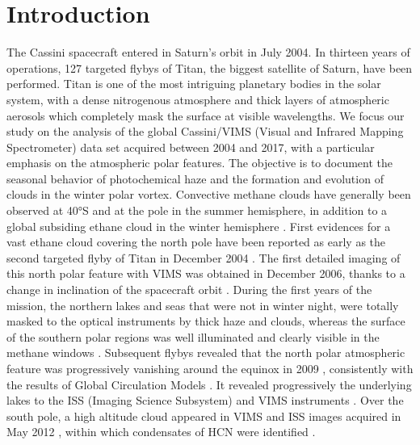 \documentclass[preprint,twocolumn,5p,authoryear,compress,colorlinks=true]{elsarticle}
\begin{document}
\section{Introduction}
The Cassini spacecraft entered in Saturn's orbit in July 2004. In thirteen years of operations, 127 targeted flybys of Titan, the biggest satellite of Saturn, have been performed. Titan is one of the most intriguing planetary bodies in the solar system, with a dense nitrogenous atmosphere and thick layers of atmospheric aerosols which completely mask the surface at visible wavelengths. We focus our study on the analysis of the global Cassini/VIMS (Visual and Infrared Mapping Spectrometer) data set acquired between 2004 and 2017, with a particular emphasis on the atmospheric polar features.
The objective is to document the seasonal behavior of photochemical haze and the formation and evolution of clouds in the winter polar vortex. Convective methane clouds have generally been observed at \ang{40}S and at the pole in the summer hemisphere, in addition to a global subsiding ethane cloud in the winter hemisphere \citep{Griffith2006,Hirtzig2006,Rannou2006,Rodriguez2011}. First evidences for a vast ethane cloud covering the north pole have been reported as early as the second targeted flyby of Titan in December 2004 \citep{Griffith2006}.
The first detailed imaging of this north polar feature with VIMS was obtained in December 2006, thanks to a change in inclination of the spacecraft orbit \citep{LeMouelic2012}.
During the first years of the mission, the northern lakes and seas that were not in winter night, were totally masked to the optical instruments by thick haze and clouds, whereas the surface of the southern polar regions was well illuminated and clearly visible in the methane windows \citep{Porco2005,Barnes2009,Turtle2009}.
Subsequent flybys revealed that the north polar atmospheric feature was progressively vanishing around the equinox in 2009 \citep{Rodriguez2009,Rodriguez2011,Brown2010,LeMouelic2012}, consistently with the results of Global Circulation Models \citep{Rannou2006}.
It revealed progressively the underlying lakes to the ISS (Imaging Science Subsystem) and VIMS instruments \citep{Turtle2011,Barnes2011}. Over the south pole, a high altitude cloud appeared in VIMS and ISS images acquired in May 2012 \citep{deKok2014,West2016}, within which condensates of HCN were identified \citep{deKok2014,Teanby2017}.
\end{document}
